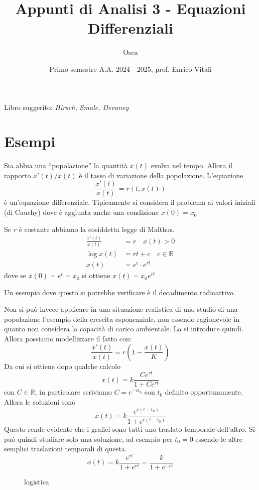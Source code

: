 
\title{Appunti di Analisi 3 \-- Equazioni Differenziali}
\author{Osea}
\date{Primo semestre A.A. 2024 \-- 2025, prof. Enrico Vitali}


\maketitle
Libro suggerito: \emph{Hirsch, Smale, Devaney}


\setcounter{section}{-1}
\section{Esempi}
Sia abbia una ``popolazione'' la quantità $x(t)$ evolva nel tempo. Allora il
rapporto \(x'(t) / x(t)\) è il tasso di variazione della popolazione.
L'equazione
\[
    \frac{x'(t)}{x(t)} = r(t, x(t))
\]
è un'equazione differenziale. Tipicamente si considera il problema ai valori
iniziali (di Cauchy) dove è aggiunta anche una condizione \(x(0) = x_{0}\) 

\begin{example}[Malthus]
    Se \(r\) è costante abbiamo la cosiddetta legge di Malthus.
    \begin{align*}
        \frac{x'(t)}{x(t)} &= r \quad x(t) > 0 \\
        \log x(t) &= rt + c \quad c \in \mathbb{R} \\
        x(t) &= e^{c} \cdot e^{rt}
    \end{align*}
    dove se \(x(0) = e^{c} = x_{0}\) si ottiene \(x(t) = x_{0} e^{rt}\) 

    Un esempio dove questo si potrebbe verificare è il decadimento radioattivo.
\end{example}

\begin{example}[Logistica]
    Non si può invece applicare in una situazione realistica di uno studio di
    una popolazione l'esempio della crescita esponenziale, non essendo
    ragionevole in quanto non considera la capacità di carico ambientale. La si
    introduce quindi. Allora possiamo modellizzare il fatto con:
    \[
        \frac{x'(t)}{x(t)} = r\left(1 - \frac{x(t)}{K}\right)
    \]
    Da cui si ottiene dopo qualche calcolo
    \[
        x(t) = k \frac{Ce^{rt}}{1 + Ce^{rt}}
    \]
    con \(C \in \mathbb{R}\), in particolare scriviamo \(C = e^{-rt_{0}}\) con
    \(t_{0}\) definito opportunamente. Allora le soluzioni sono 
    \[
        x(t) = k \frac{e^{r(t-t_{0})}}{1 + e^{r(t-t_{0})}}
    \]
    Questo rende evidente che i grafici sono tutti uno traslato temporale
    dell'altro. Si può quindi studiare solo una soluzione, ad esempio per
    \(t_{0}=0\) essendo le altre semplici traslazioni temporali di questa.
    \[
        x(t) = k \frac{e^{rt}}{1 + e^{rt}} = \frac{k}{1 + e^{-rt}}
    \]
\begin{figure}[ht]
    \centering
    \caption{logistica}\label{fig:logistica}
\end{figure}
\end{example}

